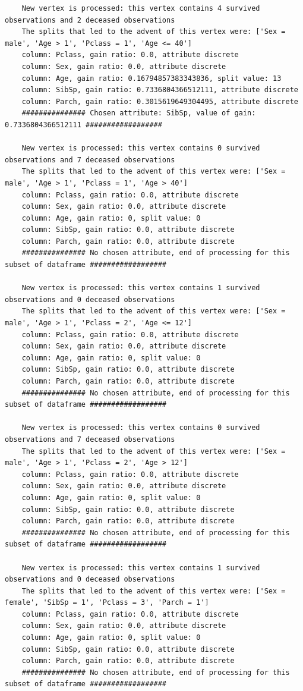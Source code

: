 \documentclass[12pt]{article}
\begin{document}
\begin{verbatim}
	New vertex is processed: this vertex contains 4 survived observations and 2 deceased observations
	The splits that led to the advent of this vertex were: ['Sex = male', 'Age > 1', 'Pclass = 1', 'Age <= 40']
	column: Pclass, gain ratio: 0.0, attribute discrete
	column: Sex, gain ratio: 0.0, attribute discrete
	column: Age, gain ratio: 0.16794857383343836, split value: 13
	column: SibSp, gain ratio: 0.7336804366512111, attribute discrete
	column: Parch, gain ratio: 0.3015619649304495, attribute discrete
	############### Chosen attribute: SibSp, value of gain: 0.7336804366512111 ##################
	
	New vertex is processed: this vertex contains 0 survived observations and 7 deceased observations
	The splits that led to the advent of this vertex were: ['Sex = male', 'Age > 1', 'Pclass = 1', 'Age > 40']
	column: Pclass, gain ratio: 0.0, attribute discrete
	column: Sex, gain ratio: 0.0, attribute discrete
	column: Age, gain ratio: 0, split value: 0
	column: SibSp, gain ratio: 0.0, attribute discrete
	column: Parch, gain ratio: 0.0, attribute discrete
	############### No chosen attribute, end of processing for this subset of dataframe ##################
	
	New vertex is processed: this vertex contains 1 survived observations and 0 deceased observations
	The splits that led to the advent of this vertex were: ['Sex = male', 'Age > 1', 'Pclass = 2', 'Age <= 12']
	column: Pclass, gain ratio: 0.0, attribute discrete
	column: Sex, gain ratio: 0.0, attribute discrete
	column: Age, gain ratio: 0, split value: 0
	column: SibSp, gain ratio: 0.0, attribute discrete
	column: Parch, gain ratio: 0.0, attribute discrete
	############### No chosen attribute, end of processing for this subset of dataframe ##################
	
	New vertex is processed: this vertex contains 0 survived observations and 7 deceased observations
	The splits that led to the advent of this vertex were: ['Sex = male', 'Age > 1', 'Pclass = 2', 'Age > 12']
	column: Pclass, gain ratio: 0.0, attribute discrete
	column: Sex, gain ratio: 0.0, attribute discrete
	column: Age, gain ratio: 0, split value: 0
	column: SibSp, gain ratio: 0.0, attribute discrete
	column: Parch, gain ratio: 0.0, attribute discrete
	############### No chosen attribute, end of processing for this subset of dataframe ##################
	
	New vertex is processed: this vertex contains 1 survived observations and 0 deceased observations
	The splits that led to the advent of this vertex were: ['Sex = female', 'SibSp = 1', 'Pclass = 3', 'Parch = 1']
	column: Pclass, gain ratio: 0.0, attribute discrete
	column: Sex, gain ratio: 0.0, attribute discrete
	column: Age, gain ratio: 0, split value: 0
	column: SibSp, gain ratio: 0.0, attribute discrete
	column: Parch, gain ratio: 0.0, attribute discrete
	############### No chosen attribute, end of processing for this subset of dataframe ##################
	

\end{verbatim}
\end{document}

